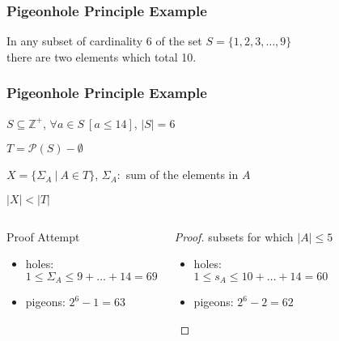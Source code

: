 \documentclass[dvipsnames]{beamer}
\begin{document}
\begin{frame}
  \frametitle{Pigeonhole Principle Example}

  \begin{theorem}
    In any subset of cardinality 6 of the set $S = \{1,2,3,\dots,9\}$\\
    there are two elements which total 10.
  \end{theorem}
\end{frame}

\begin{frame}
  \frametitle{Pigeonhole Principle Example}

  \begin{theorem}
    $S \subseteq \mathbb{Z}^+$, $\forall a \in S~[a \leq 14]$, $|S|=6$

    $T = \mathcal{P}(S) - \emptyset$

    $X = \{\Sigma_A~|~A \in T\}$, $\Sigma_A:$ sum of the elements in $A$

    $|X| < |T|$
  \end{theorem}

  \pause
  \begin{columns}[t]
    \begin{block}{Proof Attempt}
      \begin{itemize}
        \item holes:\\
          $1 \leq \Sigma_A \leq 9 + \dots + 14 = 69$
        \item pigeons: $2^6 - 1 = 63$
      \end{itemize}
    \end{block}

    \pause
    \begin{proof}
      subsets for which $|A| \leq 5$

      \pause
      \begin{itemize}
        \item holes:\\
          $1 \leq s_A \leq 10 + \dots + 14 = 60$
        \item pigeons: $2^6 - 2 = 62$
      \end{itemize}
    \end{proof}
  \end{columns}
\end{frame}
\end{document}

